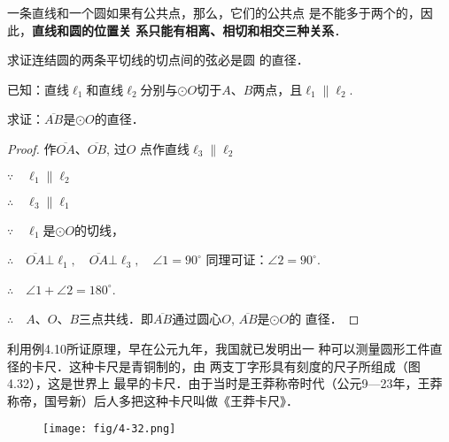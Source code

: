 一条直线和一个圆如果有公共点，那么，它们的公共点
是不能多于两个的，因此，\textbf{直线和圆的位置关
系只能有相离、相切和相交三种关系}．





\begin{example}
    求证连结圆的两条平切线的切点间的弦必是圆
的直径．

已知：直线$\ell_1$和直线$\ell_2$分别与$\odot O$切于$A$、$B$两点，且$\ell_1\parallel \ell_2$.

求证：$\overline{AB}$是$\odot O$的直径．
\end{example}

\begin{figure}[htp]
    \centering
{}
    \caption{}
\end{figure}

\begin{proof}
    作$\overline{OA}$、$\overline{OB}$, 过$O$
点作直线$\ell_3\parallel \ell_2$

$\because\quad \ell_1\parallel \ell_2$

$\therefore\quad \ell_3\parallel \ell_1$

$\because\quad \ell_1$是$\odot O$的切线，

$\therefore\quad \overline{OA}\bot \ell_1,\quad \overline{OA}\bot \ell_3,\quad \angle 1=90^{\circ}$
同理可证：$\angle 2=90^{\circ}$.

$\therefore\quad \angle 1+\angle 2=180^{\circ}$.

$\therefore\quad A$、$O$、$B$三点共线．即$\overline{AB}$通过圆心$O$, $\overline{AB}$是$\odot O$的
直径．
\end{proof}


利用例4.10所证原理，早在公元九年，我国就已发明出一
种可以测量圆形工件直径的卡尺．这种卡尺是青铜制的，由
两支丁字形具有刻度的尺子所组成（图4.32），这是世界上
最早的卡尺．由于当时是王莽称帝时代（公元9—23年，王莽
称帝，国号新）后人多把这种卡尺叫做《王莽卡尺》．
\begin{figure}[htp]
    \centering
\texttt{[image: fig/4-32.png]}
    \caption{}
\end{figure}

